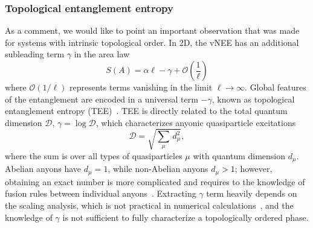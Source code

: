 \subsubsection{Topological entanglement entropy}
As a comment, we would like to point an important observation that was made for systems with intrinsic topological order. In 2D, the vNEE has an additional subleading term $\gamma$ in the area law~\cite{RevModPhys.82.277}
\begin{equation}
S (A) = \alpha \ell - \gamma + \mathcal{O} \left( \frac{1}{\ell} \right)
\label{eq:TEE}
\end{equation}
where $ \mathcal{O} \left( 1 / \ell \right)$ represents terms vanishing in the limit $\ell \rightarrow \infty$. Global features of the entanglement are encoded in a universal term $ - \gamma$, known as topological entanglement entropy (TEE)~\cite{PhysRevLett.96.110404, PhysRevLett.96.110405}. TEE is directly related to the total quantum dimension $\mathcal{D}$, $\gamma = \log \mathcal{D}$, which characterizes anyonic quasiparticle excitations
\begin{equation}
\mathcal{D} = \sqrt{\sum_{\mu} \,  d_{\mu}^2},
\label{eq:quantum_dim}
\end{equation}
where the sum is over all types of quasiparticles $\mu$ with quantum dimension $d_{\mu}$. Abelian anyons have $ d_{\mu} = 1$, while non-Abelian anyons $d_{\mu} > 1$; however, obtaining an exact number is more complicated and requires to the knowledge of fusion rules between individual anyons~\cite{fradkin2013field}. Extracting $\gamma$ term heavily depends on the scaling analysis, which is not practical in numerical calculations~\cite{L_uchli_2010, PhysRevB.75.214407, PhysRevLett.98.060401}, and the knowledge of $\gamma$ is not sufficient to fully characterize a topologically ordered phase.

